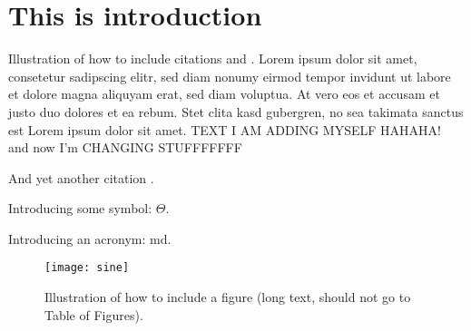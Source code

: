 \chapter{This is introduction}\label{ch:introduction}

\instructionsintroduction


Illustration of how to include citations \cite{Meert2011PhD} and \cite{VandenBroeck2011IJCAI}. Lorem ipsum dolor sit amet, consetetur sadipscing elitr, sed diam nonumy eirmod tempor invidunt ut labore et dolore magna aliquyam erat, sed diam voluptua. At vero eos et accusam et justo duo dolores et ea rebum. Stet clita kasd gubergren, no sea takimata sanctus est Lorem ipsum dolor sit amet. TEXT I AM ADDING MYSELF HAHAHA! and now I'm CHANGING STUFFFFFFF

And yet another citation \cite{FrRo2010Diffusion}.

Introducing some symbol: $\Theta$.

Introducing an acronym: \gls{md}.

\begin{figure}
  \centering
  \medskip
  \texttt{[image: sine]}
  \caption[Short caption for Table of Figures]{Illustration of how to
  include a figure (long text, should not go to Table of Figures).}
  \label{fig:sine}
\end{figure}





\cleardoublepage

